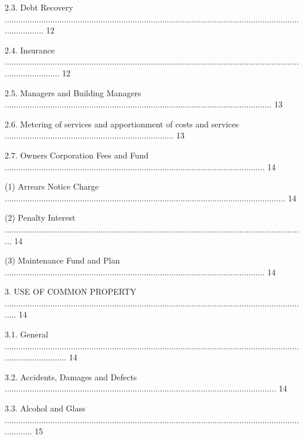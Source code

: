 \documentclass{article}
\begin{document}
{\fontsize{9.99}{1}2.3. Debt Recovery .................................................................................................................................................. 12 }

{\fontsize{9.99}{1}2.4. Insurance ......................................................................................................................................................... 12 }

{\fontsize{9.99}{1}2.5. Managers and Building Managers ..................................................................................................................... 13 }

{\fontsize{9.99}{1}2.6. Metering of services and apportionment of costs and services .......................................................................... 13 }

{\fontsize{9.99}{1}2.7. Owners Corporation Fees and Fund .................................................................................................................. 14 }

{\fontsize{9.962}{1}(1) Arrears Notice Charge ........................................................................................................................... 14 }

{\fontsize{9.962}{1}(2) Penalty Interest .................................................................................................................................... 14 }

{\fontsize{9.962}{1}(3) Maintenance Fund and Plan .................................................................................................................. 14 }

{\fontsize{9.99}{1}3. USE OF COMMON PROPERTY ...................................................................................................................................... 14 }

{\fontsize{9.99}{1}3.1. General ............................................................................................................................................................ 14 }

{\fontsize{9.99}{1}3.2. Accidents, Damages and Defects ....................................................................................................................... 14 }

{\fontsize{9.99}{1}3.3. Alcohol and Glass ............................................................................................................................................. 15 }
\end{document}
